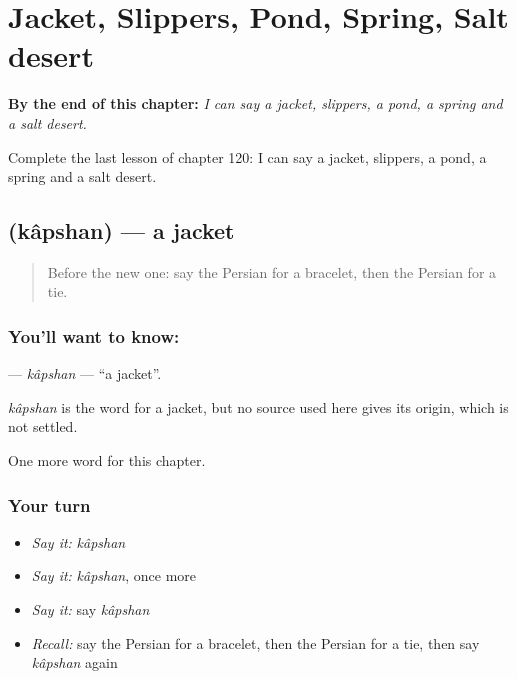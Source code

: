 
\chapter{Jacket, Slippers, Pond, Spring, Salt desert}
\label{ch:fa-jacket-slippers-pond-spring-salt-desert}

\begin{chapteropening}
\textbf{By the end of this chapter:} \emph{I can say a jacket, slippers, a pond, a spring and a salt desert.}

Complete the last lesson of chapter 120: I can say a jacket, slippers, a pond, a spring and a salt desert.
\end{chapteropening}

\section[\texorpdfstring{\fa{کاپشن} (kâpshan)}{کاپشن (kâpshan)}]{ (kâpshan) — a jacket}

\label{lesson:FA-C120-kapshan}



\begin{quote}
Before the new one: say the Persian for a bracelet, then the Persian for a tie.
\end{quote}

\subsection*{You'll want to know: }
\textbf{} — \emph{kâpshan} — \textquotedblleft{}a jacket\textquotedblright{}.

\begin{cousinweb}
\emph{kâpshan} is the word for a jacket, but no source used here gives its origin, which is not settled.
\end{cousinweb}

\begin{grammarlens}[title={What you've built}]
One more word for this chapter.
\end{grammarlens}

\subsection*{Your turn}
\begin{itemize}
\raggedright
  \item \emph{Say it:} \emph{kâpshan}
  \item \emph{Say it:} \emph{kâpshan}, once more
  \item \emph{Say it:} say \emph{kâpshan}
  \item \emph{Recall:} say the Persian for a bracelet, then the Persian for a tie, then say \emph{kâpshan} again
\end{itemize}

